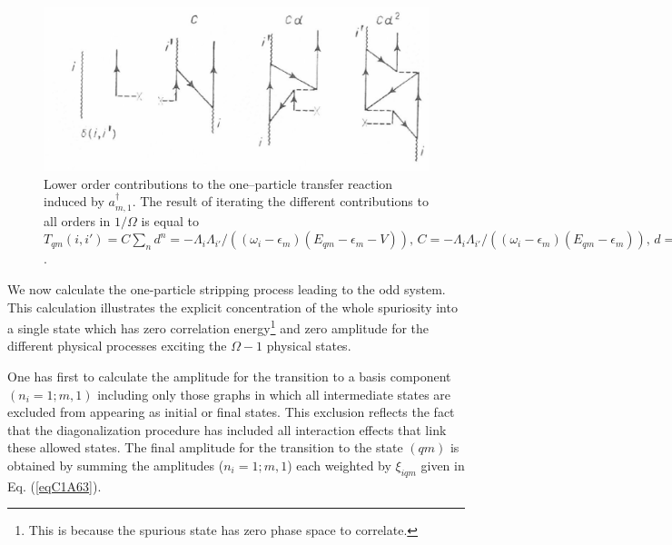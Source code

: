      \begin{figure}
     \centerline {
     \includegraphics*[width=12cm]{introduccion/figs/fig22}
     }
     \caption{Lower order contributions to the one--particle transfer reaction induced by $a^\dagger_{m,1}$. The result of iterating the different contributions to all orders in $1/\Omega$ is equal to $T_{qm}(i,i')=C\sum_nd^n=-\Lambda_i\Lambda_{i'}/\left((\omega_i-\epsilon_m)(E_{qm}-\epsilon_m-V)\right),\,C=-\Lambda_i\Lambda_{i'}/\left((\omega_i-\epsilon_m)(E_{qm}-\epsilon_m)\right),\,d=V/(E_{qm}-\epsilon_m)$.}
     \label{figC1A5}
     \end{figure}
We now calculate the one-particle stripping process leading to the odd system. This calculation illustrates the explicit concentration of the whole spuriosity into a single state which has zero correlation energy\footnote{This is because the spurious state has zero phase space to correlate.} and  zero amplitude for the different physical processes exciting the $\Omega-1$ physical states. 


One has  first to calculate the amplitude for the transition to a basis component $(n_i= 1; m, 1)$ including only those graphs in which all intermediate states are excluded from appearing as initial or final states. This exclusion reflects the fact that the diagonalization procedure has included all interaction effects that link these allowed states. The final amplitude for the transition to the state $(qm)$ is obtained by summing the amplitudes  ($n_i=1;m,1$) each weighted by  $\xi_{iqm}$ given in Eq. (\ref{eqC1A63}). 

